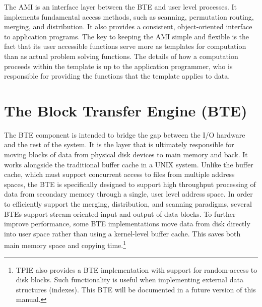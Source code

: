 
The AMI is an interface layer between
the BTE and user level processes.  It implements fundamental access
methods, such as scanning, permutation routing, merging, and
distribution. It also provides a consistent, object-oriented interface
to application programs.
The key to keeping the AMI simple and flexible is the fact that its
user accessible functions serve more as templates for computation than
as actual problem solving functions.  The details of how a computation
proceeds within the template is up to the application programmer, who
is responsible for providing the functions that the template applies
to data.

\section{The Block Transfer Engine (BTE)}



The BTE component is intended to bridge the gap between the I/O
hardware and the rest of the system. It is the layer that is
ultimately responsible for moving blocks of data from physical disk
devices to main memory and back. It works alongside the traditional
buffer cache in a UNIX system.  Unlike the buffer
cache, which must support concurrent access to files from multiple
address spaces, the BTE is specifically designed to support high
throughput processing of data from secondary memory through a single,
user level address space. In order to efficiently support the merging,
distribution, and scanning paradigms, several BTEs support
stream-oriented input and output of data blocks. To further improve
performance, some BTE implementations move data from disk directly
into user space rather than using a kernel-level buffer
cache.  This saves both main memory space and
copying time.\footnote{TPIE also provides a BTE implementation with
support for random-access to disk blocks. Such functionality is useful
when implementing external data structures (indexes). This BTE will be
documented in a future version of this manual.}
 
